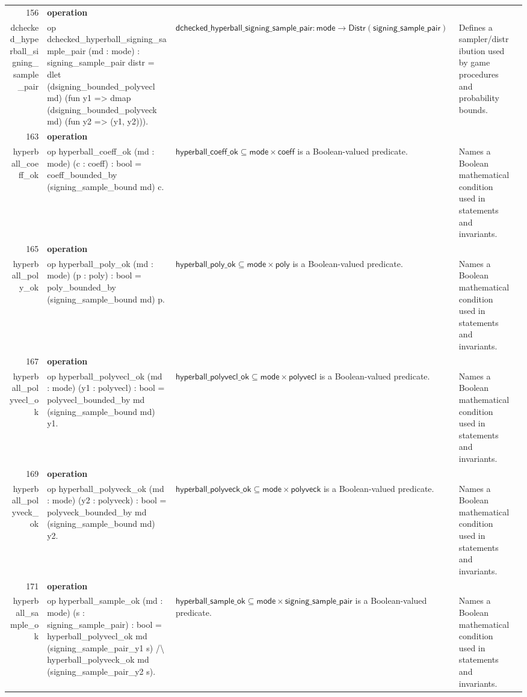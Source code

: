 \documentclass[10pt]{article}
\newcommand{\ec}[1]{\begingroup\ttfamily\scriptsize #1\endgroup}
\begin{document}
\begin{longtable}{r L{0.17\textwidth} L{0.26\textwidth} L{0.27\textwidth} L{0.20\textwidth}}
156 & \textbf{operation}\\\ec{dchecked\_hyperball\_signing\_sample\_pair} & \ec{op dchecked\_hyperball\_signing\_sample\_pair (md : mode) : signing\_sample\_pair distr = dlet (dsigning\_bounded\_polyvecl md) (fun y1 => dmap (dsigning\_bounded\_polyveck md) (fun y2 => (y1, y2))).} & \(\mathsf{dchecked\_hyperball\_signing\_sample\_pair} : \mathsf{mode} \to \mathsf{Distr}(\mathsf{signing\_sample\_pair})\) & Defines a sampler/distribution used by game procedures and probability bounds. \\
163 & \textbf{operation}\\\ec{hyperball\_coeff\_ok} & \ec{op hyperball\_coeff\_ok (md : mode) (c : coeff) : bool = coeff\_bounded\_by (signing\_sample\_bound md) c.} & \(\mathsf{hyperball\_coeff\_ok} \subseteq \mathsf{mode} \times \mathsf{coeff}\) is a Boolean-valued predicate. & Names a Boolean mathematical condition used in statements and invariants. \\
165 & \textbf{operation}\\\ec{hyperball\_poly\_ok} & \ec{op hyperball\_poly\_ok (md : mode) (p : poly) : bool = poly\_bounded\_by (signing\_sample\_bound md) p.} & \(\mathsf{hyperball\_poly\_ok} \subseteq \mathsf{mode} \times \mathsf{poly}\) is a Boolean-valued predicate. & Names a Boolean mathematical condition used in statements and invariants. \\
167 & \textbf{operation}\\\ec{hyperball\_polyvecl\_ok} & \ec{op hyperball\_polyvecl\_ok (md : mode) (y1 : polyvecl) : bool = polyvecl\_bounded\_by md (signing\_sample\_bound md) y1.} & \(\mathsf{hyperball\_polyvecl\_ok} \subseteq \mathsf{mode} \times \mathsf{polyvecl}\) is a Boolean-valued predicate. & Names a Boolean mathematical condition used in statements and invariants. \\
169 & \textbf{operation}\\\ec{hyperball\_polyveck\_ok} & \ec{op hyperball\_polyveck\_ok (md : mode) (y2 : polyveck) : bool = polyveck\_bounded\_by md (signing\_sample\_bound md) y2.} & \(\mathsf{hyperball\_polyveck\_ok} \subseteq \mathsf{mode} \times \mathsf{polyveck}\) is a Boolean-valued predicate. & Names a Boolean mathematical condition used in statements and invariants. \\
171 & \textbf{operation}\\\ec{hyperball\_sample\_ok} & \ec{op hyperball\_sample\_ok (md : mode) (s : signing\_sample\_pair) : bool = hyperball\_polyvecl\_ok md (signing\_sample\_pair\_y1 s) /\textbackslash{} hyperball\_polyveck\_ok md (signing\_sample\_pair\_y2 s).} & \(\mathsf{hyperball\_sample\_ok} \subseteq \mathsf{mode} \times \mathsf{signing\_sample\_pair}\) is a Boolean-valued predicate. & Names a Boolean mathematical condition used in statements and invariants. \\

\end{longtable}
\end{document}
